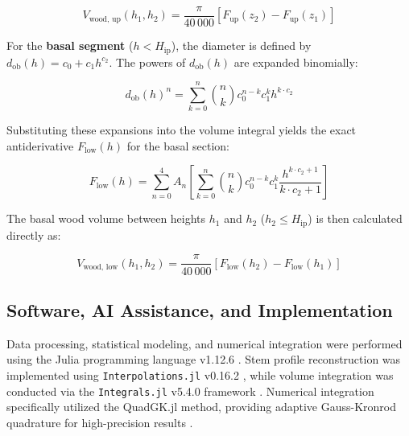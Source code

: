 \documentclass[twocolumn, bibliography=totoc]{scrartcl}
\begin{document}
\begin{equation}
    V_{\text{wood, up}}(h_1, h_2) = \frac{\pi}{40\,000} \left[ F_{\text{up}}(z_2) - F_{\text{up}}(z_1) \right]
\end{equation}

For the \textbf{basal segment} ($h < H_{\text{ip}}$), the diameter is defined by $d_{\text{ob}}(h) = c_0 + c_1 h^{c_2}$. The powers of $d_{\text{ob}}(h)$ are expanded binomially:

\begin{equation}
    d_{\text{ob}}(h)^n = \sum_{k=0}^{n} \binom{n}{k} c_0^{n-k} c_1^k h^{k \cdot c_2}
\end{equation}

Substituting these expansions into the volume integral yields the exact antiderivative $F_{\text{low}}(h)$ for the basal section:

\begin{equation}
    F_{\text{low}}(h) = \sum_{n=0}^{4} A_n \left[ \sum_{k=0}^{n} \binom{n}{k} c_0^{n-k} c_1^k \frac{h^{k \cdot c_2 + 1}}{k \cdot c_2 + 1} \right]
\end{equation}

The basal wood volume between heights $h_1$ and $h_2$ ($h_2 \le H_{\text{ip}}$) is then calculated directly as:

\begin{equation}
    V_{\text{wood, low}}(h_1, h_2) = \frac{\pi}{40\,000} \left[ F_{\text{low}}(h_2) - F_{\text{low}}(h_1) \right]
\end{equation}


\subsection{Software, AI Assistance, and Implementation}

Data processing, statistical modeling, and numerical integration were performed using the \textsf{Julia} programming language v1.12.6 \citep{Julia-2017}. Stem profile reconstruction was implemented using \texttt{Interpolations.jl} v0.16.2 \citep{juliaInterpolations}, while volume integration was conducted via the \texttt{Integrals.jl} v5.4.0 framework \citep{juliaIntegrals}. Numerical integration specifically utilized the \textsf{QuadGK.jl} method, providing adaptive Gauss-Kronrod quadrature for high-precision results \citep{laurie1997calculation}.
\end{document}
